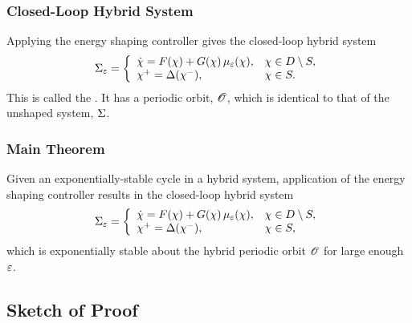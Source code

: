 \begin{frame}[t]
  \frametitle{Closed-Loop Hybrid System}
  Applying the energy shaping controller gives the closed-loop hybrid system
  \begin{align*}
    \Sigma_{\varepsilon} = \left\{
      \begin{array}{l l}
        {\dot {\chi}} = F(\chi) + G(\chi) \, \mu_{\varepsilon}(\chi), & \chi \in D \setminus S,\\
        \chi^{+} = \Delta(\chi^{-}), & \chi \in S.
      \end{array}\right.
  \end{align*}
  This is called the . It has a periodic orbit, $\mathscr O$,
  which is identical to that of the unshaped system, $\Sigma$.
\end{frame}


\begin{frame}[t]
  \frametitle{Main Theorem}

  \begin{theorem}
    Given an exponentially-stable cycle in a hybrid system, application
    of the energy shaping controller results in the closed-loop hybrid system
    \begin{align*}
      \Sigma_{\varepsilon} = \left\{
        \begin{array}{l l}
          {\dot {\chi}} = F(\chi) + G(\chi) \, \mu_{\varepsilon}(\chi), & \chi \in D \setminus S,\\
          \chi^{+} = \Delta(\chi^{-}), & \chi \in S,
        \end{array}\right.
    \end{align*}
    which is exponentially stable about the hybrid periodic orbit $\mathscr O$ for
    large enough $\varepsilon$.
    
  \end{theorem}
\end{frame}

\subsection{Sketch of Proof}

